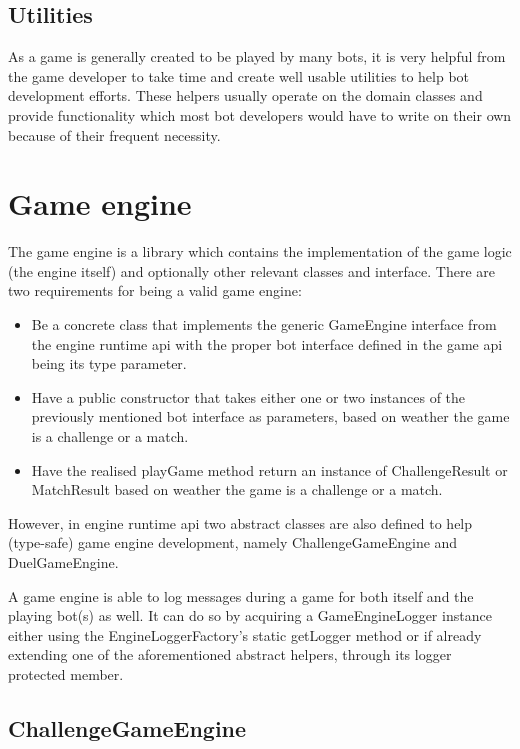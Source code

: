 		\subsection*{Utilities}
		
		As a game is generally created to be played by many bots, it is very helpful from the game developer to take time and create well usable utilities to help bot development efforts. These helpers usually operate on the domain classes and provide functionality which most bot developers would have to write on their own because of their frequent necessity.

	\section{Game engine}
	
	The game engine is a library which contains the implementation of the game logic (the engine itself) and optionally other relevant classes and interface. There are two requirements for being a valid game engine:
	
	\begin{itemize}
		\item Be a concrete class that implements the generic GameEngine interface from the engine runtime api
		with the proper bot interface defined in the game api being its type parameter.
		
		\item Have a public constructor that takes either one or two instances of the previously mentioned bot 
		interface as parameters, based on weather the game is a challenge or a match.
		
		\item Have the realised playGame method return an instance of ChallengeResult or MatchResult based on 
		weather the game is a challenge or a match.
	\end{itemize} 
	
	However, in engine runtime api two abstract classes are also defined to help (type-safe) game engine development, namely ChallengeGameEngine and DuelGameEngine.
	
	A game engine is able to log messages during a game for both itself and the playing bot(s) as well. It can do so by acquiring a GameEngineLogger instance either using the EngineLoggerFactory's static getLogger method or if already extending one of the aforementioned abstract helpers, through its logger protected member.  
	
		\subsection*{ChallengeGameEngine}
		

